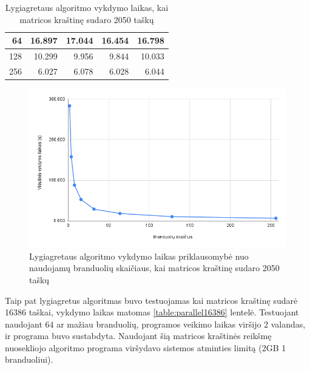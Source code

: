 \documentclass{VUMIFPSbakalaurinis}
\begin{document}
\begin{table}[H]
\begin{tabular}{|r|rrrr|}
        64                                                         & \multicolumn{1}{r|}{16.897}             & \multicolumn{1}{r|}{17.044}     & \multicolumn{1}{r|}{16.454}     & 16.798                        \\ \hline
        128                                                        & \multicolumn{1}{r|}{10.299}             & \multicolumn{1}{r|}{9.956}      & \multicolumn{1}{r|}{9.844}      & 10.033                        \\ \hline
        256                                                        & \multicolumn{1}{r|}{6.027}              & \multicolumn{1}{r|}{6.078}      & \multicolumn{1}{r|}{6.028}      & 6.044                         \\ \hline
    \end{tabular}
    \caption{Lygiagretaus algoritmo vykdymo laikas, kai matricos kraštinę sudaro 2050 taškų}
    \label{table:parallel2050}
\end{table}

\begin{figure}[H]
    \centering
    \includegraphics[scale=0.5]{img/parallel_time.png}
    \caption{Lygiagretaus algoritmo vykdymo laikas priklausomybė nuo naudojamų branduolių skaičiaus, kai matricos kraštinę sudaro 2050 taškų}
    \label{img:parallel_time}
\end{figure}


Taip pat lygiagretus algoritmas buvo testuojamas kai matricos kraštinę sudarė 16386 taškai, vykdymo laikas matomas \ref{table:parallel16386} lentelė.
Testuojant naudojant 64 ar mažiau branduolių, programos veikimo laikas viršijo 2 valandas, ir programa buvo sustabdyta. 
Naudojant šią matricos kraštinės reikšmę nuosekliojo algoritmo programa viršydavo sistemos atminties limitą (2GB 1 branduoliui).
\end{document}

